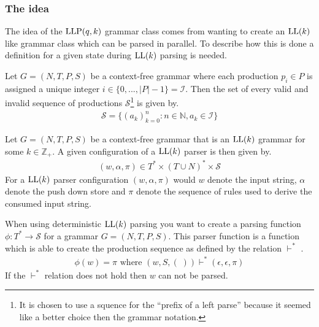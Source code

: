 \subsubsection{The idea}
The idea of the $\text{LLP}(q, k)$ grammar class comes from wanting to create an $\text{LL}(k)$ like grammar class which can be parsed in parallel. To describe how this is done a definition for a given state during $\text{LL}(k)$ parsing is needed.

\begin{definition}
    \label{def:production-sequence}
    Let $G = (N, T, P, S)$ be a context-free grammar where each production $p_i \in P$ is assigned a unique integer $i \in \{0, ..., |P| - 1\} = \mathcal{I}$. Then the set of every valid and invalid sequence of productions $\mathcal{S}$\footnote{It is chosen to use a squence for the ``prefix of  a left parse'' \cite[5]{Vagner2007} because it seemed like a better choice then the grammar notation.} is given by.
    \begin{align*}
        \mathcal{S} = \{(a_k)_{k=0}^n : n \in \mathbb{N}, a_k \in \mathcal{I}\}
    \end{align*}
\end{definition}

\begin{definition}
    \label{def:ll-configuration}
    Let $G = (N, T, P, S)$ be a context-free grammar that is an $\text{LL}(k)$ grammar for some $k \in \mathbb{Z}_+$. A given configuration \cite[p. 5]{Vagner2007} of a $\text{LL}(k)$ parser is then given by.
    \begin{align*}
        (w, \alpha, \pi) \in T^* \times (T \cup N)^* \times \mathcal{S}
    \end{align*}
    For a $\text{LL}(k)$ parser configuration $(w, \alpha, \pi)$ would $w$ denote the input string, $\alpha$ denote the push down store and $\pi$ denote the sequence of rules used to derive the consumed input string.
\end{definition}
\noindent When using deterministic $\text{LL}(k)$ parsing you want to create a parsing function $\phi: T^* \to \mathcal{S}$ for a grammar $G = (N, T, P, S)$. This parser function is a function which is able to create the production sequence as defined by the relation $\vdash^*$ \cite[6]{Vagner2007}.
\begin{align*}
    \phi(w) = \pi \text{ where } (w, S, (\;)) \vdash^* (\epsilon, \epsilon, \pi) 
\end{align*}
If the $\vdash^*$ relation does not hold then $w$ can not be parsed. 

